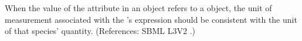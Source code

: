 When the value of the attribute  in an \InitialAssignment
object refers to a \Species object, the unit of measurement associated with
the \InitialAssignment's  expression should be consistent with
the unit of that species' quantity.  (References: SBML L3V2
.)

